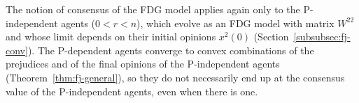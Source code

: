 The notion of consensus of the FDG model applies again only to the P-independent agents
($0 < r < n$), which evolve as an FDG model with matrix $W^{22}$ and whose limit depends
on their initial opinions $x^2(0)$ (Section~\ref{subsubsec:fj-conv}). The P-dependent
agents converge to convex combinations of the prejudices and of the final opinions of
the P-independent agents (Theorem~\ref{thm:fj-general}), so they do not necessarily end
up at the consensus value of the P-independent agents, even when there is one.

